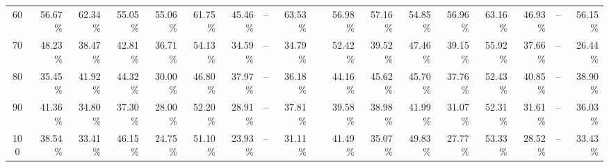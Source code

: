 \begin{table}[h!]
{\begin{tabular}{c rrrrrrrr c rrrrrrrr}
60 & 56.67\% & 62.34\% & 55.05\% & 55.06\% & 61.75\% & 45.46\% & -- & 63.53\% &  & 56.98\% & 57.16\% & 54.85\% & 56.96\% & 63.16\% & 46.93\% & -- & 56.15\% \\
70 & 48.23\% & 38.47\% & 42.81\% & 36.71\% & 54.13\% & 34.59\% & -- & 34.79\% &  & 52.42\% & 39.52\% & 47.46\% & 39.15\% & 55.92\% & 37.66\% & -- & 26.44\% \\
80 & 35.45\% & 41.92\% & 44.32\% & 30.00\% & 46.80\% & 37.97\% & -- & 36.18\% &  & 44.16\% & 45.62\% & 45.70\% & 37.76\% & 52.43\% & 40.85\% & -- & 38.90\% \\
90 & 41.36\% & 34.80\% & 37.30\% & 28.00\% & 52.20\% & 28.91\% & -- & 37.81\% &  & 39.58\% & 38.98\% & 41.99\% & 31.07\% & 52.31\% & 31.61\% & -- & 36.03\% \\
100 & 38.54\% & 33.41\% & 46.15\% & 24.75\% & 51.10\% & 23.93\% & -- & 31.11\% &  & 41.49\% & 35.07\% & 49.83\% & 27.77\% & 53.33\% & 28.52\% & -- & 33.43\% \\
\bottomrule
\end{tabular}%
}
\endgroup
\end{table}

